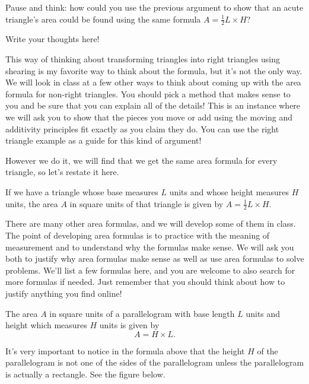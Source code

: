 \documentclass{ximera}
\begin{document}
\begin{question}
Pause and think: how could you use the previous argument to show that an acute triangle's area could be found using the same formula $A = \frac12 L \times H$?
\begin{freeResponse}
Write your thoughts here!
\end{freeResponse}
\end{question}
This way of thinking about transforming triangles into right triangles using shearing is my favorite way to think about the formula, but it's not the only way. We will look in class at a few other ways to think about coming up with the area formula for non-right triangles. You should pick a method that makes sense to you and be sure that you can explain all of the details! This is an instance where we will ask you to show that the pieces you move or add using the moving and additivity principles fit exactly as you claim they do. You can use the right triangle example as a guide for this kind of argument!

However we do it, we will find that we get the same area formula for every triangle, so let's restate it here.
\begin{theorem}
If we have a triangle whose base measures $L$ units and whose height measures $H$ units, the area $A$ in square units of that triangle is given by $A = \frac12 L \times H$.
\end{theorem}

There are many other area formulas, and we will develop some of them in class. The point of developing area formulas is to practice with the meaning of measurement and to understand why the formulas make sense. We will ask you both to justify why area formulas make sense as well as use area formulas to solve problems. We'll list a few formulas here, and you are welcome to also search for more formulas if needed. Just remember that you should think about how to justify anything you find online!

\begin{theorem}
The area $A$ in square units of a parallelogram with base length $L$ units and height which measures $H$ units is given by
\[
A = H \times L.
\]
\end{theorem}
It's very important to notice in the formula above that the height $H$ of the parallelogram is not one of the sides of the parallelogram unless the parallelogram is actually a rectangle. See the figure below.
\begin{image}
\end{image}
\end{document}
